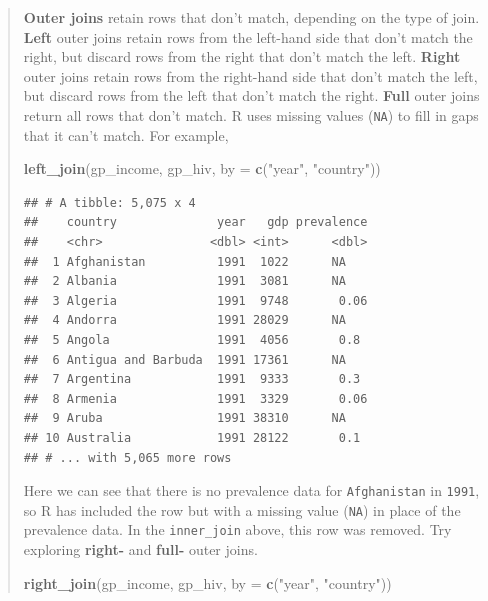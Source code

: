 \documentclass[]{book}
\newenvironment{Shaded}{\begin{snugshade}}{\end{snugshade}}
\newcommand{\KeywordTok}[1]{\textcolor[rgb]{0.13,0.29,0.53}{\textbf{{#1}}}}
\newcommand{\DataTypeTok}[1]{\textcolor[rgb]{0.13,0.29,0.53}{{#1}}}
\newcommand{\StringTok}[1]{\textcolor[rgb]{0.31,0.60,0.02}{{#1}}}
\newcommand{\NormalTok}[1]{{#1}}
\theoremstyle{definition}
\theoremstyle{definition}
\theoremstyle{definition}
\theoremstyle{remark}
\begin{document}
\begin{quote}
\textbf{Outer joins} retain rows that don't match, depending on the type
of join. \textbf{Left} outer joins retain rows from the left-hand side
that don't match the right, but discard rows from the right that don't
match the left. \textbf{Right} outer joins retain rows from the
right-hand side that don't match the left, but discard rows from the
left that don't match the right. \textbf{Full} outer joins return all
rows that don't match. R uses missing values (\texttt{NA}) to fill in
gaps that it can't match. For example,

\begin{Shaded}
\begin{Highlighting}[]
\KeywordTok{left_join}\NormalTok{(gp_income, gp_hiv, }\DataTypeTok{by =} \KeywordTok{c}\NormalTok{(}\StringTok{"year"}\NormalTok{, }\StringTok{"country"}\NormalTok{))}
\end{Highlighting}
\end{Shaded}

\begin{verbatim}
## # A tibble: 5,075 x 4
##    country              year   gdp prevalence
##    <chr>               <dbl> <int>      <dbl>
##  1 Afghanistan          1991  1022      NA   
##  2 Albania              1991  3081      NA   
##  3 Algeria              1991  9748       0.06
##  4 Andorra              1991 28029      NA   
##  5 Angola               1991  4056       0.8 
##  6 Antigua and Barbuda  1991 17361      NA   
##  7 Argentina            1991  9333       0.3 
##  8 Armenia              1991  3329       0.06
##  9 Aruba                1991 38310      NA   
## 10 Australia            1991 28122       0.1 
## # ... with 5,065 more rows
\end{verbatim}

Here we can see that there is no prevalence data for
\texttt{Afghanistan} in \texttt{1991}, so R has included the row but
with a missing value (\texttt{NA}) in place of the prevalence data. In
the \texttt{inner\_join} above, this row was removed. Try exploring
\textbf{right-} and \textbf{full-} outer joins.

\begin{Shaded}
\begin{Highlighting}[]
\KeywordTok{right_join}\NormalTok{(gp_income, gp_hiv, }\DataTypeTok{by =} \KeywordTok{c}\NormalTok{(}\StringTok{"year"}\NormalTok{, }\StringTok{"country"}\NormalTok{))}
\end{Highlighting}
\end{Shaded}


\end{quote}
\end{document}

